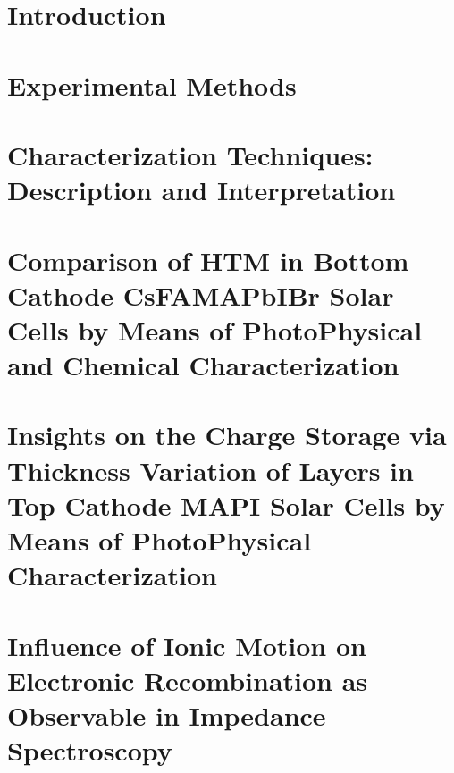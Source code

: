 \documentclass[b5paper, 12pt, openright]{book} %
\begin{document}
	\restoregeometry


	\mainmatter
	\pagestyle{headings}

\chapter{Introduction}\label{ch:intro}
	\graphicspath{ {./contents_img/intro/} }
	

\chapter{Experimental Methods}\label{ch:methods}
	\graphicspath{ {./contents_img/methods/} }
	

\chapter{Characterization Techniques: Description and Interpretation}\label{ch:interpretation}
	\graphicspath{ {./contents_img/characterization/} }
	

\chapter{Comparison of HTM in Bottom Cathode CsFAMAPbIBr Solar Cells by Means of PhotoPhysical and Chemical Characterization}\label{ch:tae}
	\graphicspath{ {./contents_img/tae/} }
	

\chapter{Insights on the Charge Storage via Thickness Variation of Layers in Top Cathode MAPI Solar Cells by Means of PhotoPhysical Characterization}\label{ch:thicknesses}
	\graphicspath{ {./contents_img/thicknesses/} }
	

\chapter{Influence of Ionic Motion on Electronic Recombination as Observable in Impedance Spectroscopy}\label{ch:impedance}
	\graphicspath{ {./contents_img/impedance/} }
	
\end{document}
